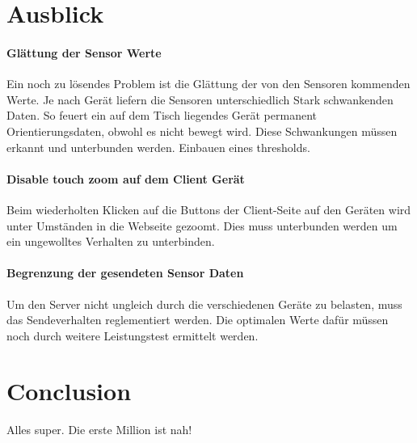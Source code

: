 \documentclass[a4paper]{spie}  %
\begin{document}
\section{Ausblick}

\paragraph{Glättung der Sensor Werte} Ein noch zu lösendes Problem ist die Glättung der von den Sensoren kommenden Werte. Je nach Gerät liefern die Sensoren unterschiedlich Stark schwankenden Daten. So feuert ein auf dem Tisch liegendes Gerät permanent Orientierungsdaten, obwohl es nicht bewegt wird. Diese Schwankungen müssen erkannt und unterbunden werden. Einbauen eines thresholds.


\paragraph{Disable touch zoom auf dem Client Gerät}
Beim wiederholten Klicken auf die Buttons der Client-Seite auf den Geräten wird unter Umständen in die Webseite gezoomt. Dies muss unterbunden werden um ein ungewolltes Verhalten zu unterbinden.


\paragraph{Begrenzung der gesendeten Sensor Daten}
Um den Server nicht ungleich durch die verschiedenen Geräte zu belasten, muss das Sendeverhalten reglementiert werden. Die optimalen Werte dafür müssen noch durch weitere Leistungstest ermittelt werden.



\section{Conclusion}
Alles super. Die erste Million ist nah!





\newpage
\appendix
\end{document}
